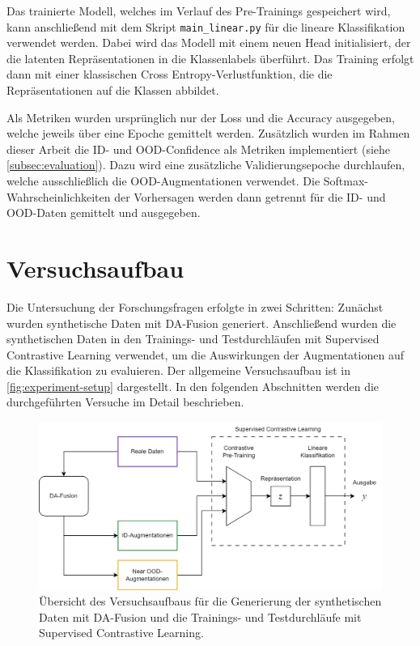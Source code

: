 Das trainierte Modell, welches im Verlauf des Pre-Trainings gespeichert wird, kann anschließend mit dem Skript \lstinline{main_linear.py} für die lineare Klassifikation verwendet werden. Dabei wird das Modell mit einem neuen Head initialisiert, der die latenten Repräsentationen in die Klassenlabels überführt. Das Training erfolgt dann mit einer klassischen Cross Entropy-Verlustfunktion, die die Repräsentationen auf die Klassen abbildet.

Als Metriken wurden ursprünglich nur der Loss und die Accuracy ausgegeben, welche jeweils über eine Epoche gemittelt werden. Zusätzlich wurden im Rahmen dieser Arbeit die ID- und OOD-Confidence als Metriken implementiert (siehe \autoref{subsec:evaluation}). Dazu wird eine zusätzliche Validierungsepoche durchlaufen, welche ausschließlich die OOD-Augmentationen verwendet. Die Softmax-Wahrscheinlichkeiten der Vorhersagen werden dann getrennt für die ID- und OOD-Daten gemittelt und ausgegeben.

\section{Versuchsaufbau} \label{sec:experiment-setup}

Die Untersuchung der Forschungsfragen erfolgte in zwei Schritten: Zunächst wurden synthetische Daten mit DA-Fusion generiert. Anschließend wurden die synthetischen Daten in den Trainings- und Testdurchläufen mit Supervised Contrastive Learning verwendet, um die Auswirkungen der Augmentationen auf die Klassifikation zu evaluieren. Der allgemeine Versuchsaufbau ist in \autoref{fig:experiment-setup} dargestellt. In den folgenden Abschnitten werden die durchgeführten Versuche im Detail beschrieben.

\begin{figure}
	\centering
	\includegraphics[width=\textwidth]{figure_flowchart.png}
	\caption{Übersicht des Versuchsaufbaus für die Generierung der synthetischen Daten mit DA-Fusion und die Trainings- und Testdurchläufe mit Supervised Contrastive Learning.}
	\label{fig:experiment-setup}
\end{figure}

